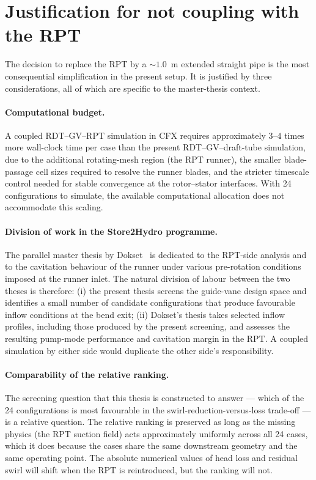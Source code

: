 \section{Justification for not coupling with the RPT}
\label{sec:rpt-decoupling-justification}
 
The decision to replace the RPT by a $\sim 1.0$~m extended straight pipe is the most consequential simplification in the present setup. It is justified by three considerations, all of which are specific to the master-thesis context.
 
\paragraph{Computational budget.} A coupled RDT--GV--RPT simulation in CFX requires approximately $3$--$4$ times more wall-clock time per case than the present RDT--GV--draft-tube simulation, due to the additional rotating-mesh region (the RPT runner), the smaller blade-passage cell sizes required to resolve the runner blades, and the stricter timescale control needed for stable convergence at the rotor--stator interfaces. With 24 configurations to simulate, the available computational allocation does not accommodate this scaling.
 
\paragraph{Division of work in the Store2Hydro programme.} The parallel master thesis by Dokset~\cite{Dokset2025} is dedicated to the RPT-side analysis and to the cavitation behaviour of the runner under various pre-rotation conditions imposed at the runner inlet. The natural division of labour between the two theses is therefore: (i) the present thesis screens the guide-vane design space and identifies a small number of candidate configurations that produce favourable inflow conditions at the bend exit; (ii) Dokset's thesis takes selected inflow profiles, including those produced by the present screening, and assesses the resulting pump-mode performance and cavitation margin in the RPT. A coupled simulation by either side would duplicate the other side's responsibility.
 
\paragraph{Comparability of the relative ranking.} The screening question that this thesis is constructed to answer --- which of the 24 configurations is most favourable in the swirl-reduction-versus-loss trade-off --- is a relative question. The relative ranking is preserved as long as the missing physics (the RPT suction field) acts approximately uniformly across all 24 cases, which it does because the cases share the same downstream geometry and the same operating point. The absolute numerical values of head loss and residual swirl will shift when the RPT is reintroduced, but the ranking will not.
 
